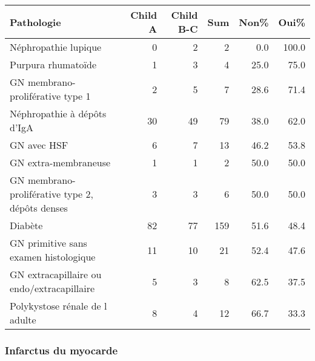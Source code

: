 \documentclass[11pt,a4paper]{article}\usepackage[]{graphicx}\usepackage[]{color}
\begin{document}
\begin{table}[H]
\centering
\begin{tabular}{lrrrrr}
  \hline
Pathologie & Child A & Child B-C & Sum & Non\% & Oui\% \\ 
  \hline
Néphropathie lupique &  0 &  2 &  2 & 0.0 & 100.0 \\ 
  Purpura rhumatoïde &  1 &  3 &  4 & 25.0 & 75.0 \\ 
  GN membrano-proliférative type 1 &  2 &  5 &  7 & 28.6 & 71.4 \\ 
  Néphropathie à dépôts d'IgA & 30 & 49 & 79 & 38.0 & 62.0 \\ 
  GN avec HSF &  6 &  7 & 13 & 46.2 & 53.8 \\ 
  GN extra-membraneuse &  1 &  1 &  2 & 50.0 & 50.0 \\ 
  GN membrano-proliférative type 2, dépôts denses &  3 &  3 &  6 & 50.0 & 50.0 \\ 
  Diabète & 82 & 77 & 159 & 51.6 & 48.4 \\ 
  GN primitive sans examen histologique & 11 & 10 & 21 & 52.4 & 47.6 \\ 
  GN extracapillaire ou endo/extracapillaire &  5 &  3 &  8 & 62.5 & 37.5 \\ 
  Polykystose rénale de l adulte &  8 &  4 & 12 & 66.7 & 33.3 \\ 
   \hline
\end{tabular}
\end{table}


\subsubsection*{Infarctus du myocarde}
\end{document}

